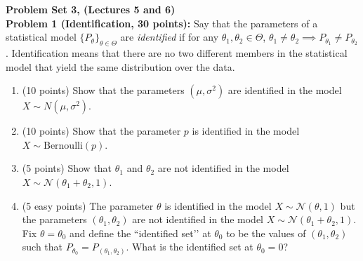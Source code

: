 \documentclass[11pt]{article} %
\begin{document}
\onehalfspace






\noindent \textbf{Problem Set 3, (Lectures 5 and 6)} \\

\noindent \textbf{Problem 1 (Identification, 30 points):} Say that the parameters of a statistical model $\{P_{\theta}\}_{\theta \in \Theta}$ are \emph{identified} if for any $\theta_1, \theta_2 \in \Theta$, $\theta_1 \neq \theta_2 \implies P_{\theta_1} \neq P_{\theta_2}$. Identification means that there are no two different members in the statistical model that yield the same distribution over the data. 

\begin{enumerate}
\item (10 points) Show that the parameters $(\mu,\sigma^2)$ are identified in the model $X \sim N(\mu, \sigma^2)$. 
\item (10 points) Show that the parameter $p$ is identified in the model $X \sim \textrm{Bernoulli}(p)$. 
\item (5 points) Show that $\theta_1$ and $\theta_2$ are not identified in the model $X \sim \mathcal{N}(\theta_1+\theta_2, 1)$. 

\item (5 easy points)  The parameter $\theta$ is identified in the model $X \sim \mathcal{N}(\theta,1)$ but the parameters $(\theta_1,\theta_2)$ are not identified in the model $X \sim \mathcal{N}(\theta_1+\theta_2, 1)$. Fix $\theta = \theta_0$ and define the ``identified set’’ at $\theta_0$ to be the values of $(\theta_1,\theta_2)$ such that $P_{\theta_0} = P_{(\theta_1,\theta_2)}$. What is the identified set at $\theta_0 = 0$?
\end{enumerate}
\end{document}
